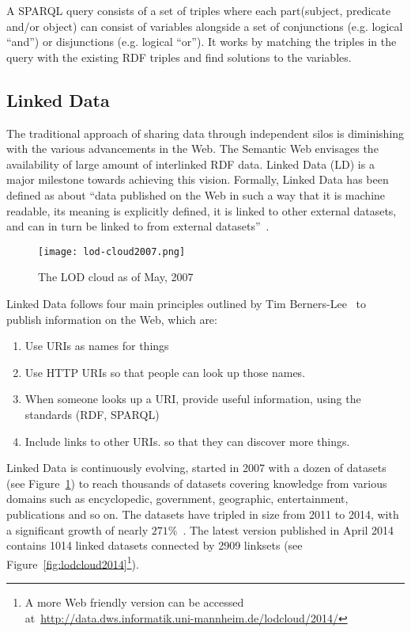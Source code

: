 A SPARQL query consists of a set of triples where each part(subject, predicate and/or object) can consist of variables alongside a set of conjunctions (e.g. logical ``and'') or disjunctions (e.g. logical ``or''). It works by matching the triples in the query with the existing RDF triples and find solutions to the variables.

\subsection{Linked Data}

The traditional approach of sharing data through independent silos is diminishing with the various advancements in the Web. The Semantic Web envisages the availability of large amount of interlinked RDF data. Linked Data (LD) is a major milestone towards achieving this vision. Formally, Linked Data has been defined as about ``data published on the Web in such a way that it is machine readable, its meaning is explicitly defined, it is linked to other external datasets, and can in turn be linked to from external datasets''~\cite{Bizer:IJSWIS:09}.

\begin{figure}[ht!]
	\texttt{[image: lod-cloud2007.png]}
	\caption{The LOD cloud as of May, 2007}
	\label{fig:lodcloud2007}
\end{figure}

Linked Data follows four main principles outlined by Tim Berners-Lee~\cite{Berners-Lee:W3C:06} to publish information on the Web, which are:

\begin{enumerate}
	\item Use URIs as names for things
	\item Use HTTP URIs so that people can look up those names.
	\item When someone looks up a URI, provide useful information, using the standards (RDF, SPARQL)
	\item Include links to other URIs. so that they can discover more things.
\end{enumerate}

Linked Data is continuously evolving, started in 2007 with a dozen of datasets (see Figure~\ref{fig:lodcloud2007}) to reach thousands of datasets covering knowledge from various domains such as encyclopedic, government, geographic, entertainment, publications and so on. The datasets have tripled in size from 2011 to 2014, with a significant growth of nearly $271\%$~\cite{Schmachtenberg:ISWC:14}. The latest version published in April 2014 contains 1014 linked datasets connected by 2909 linksets (see Figure~\ref{fig:lodcloud2014}\footnote{A more Web friendly version can be accessed at~\url{http://data.dws.informatik.uni-mannheim.de/lodcloud/2014/}}).

